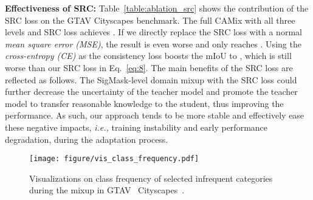 \documentclass[journal]{IEEEtran}
\begin{document}
{\begin{minipage}{\textwidth}
\noindent \textbf{Effectiveness of SRC:} Table~\ref{table:ablation_src} shows the contribution of the SRC loss on the GTAV  Cityscapes benchmark. The full CAMix with all three levels and SRC loss achieves . If we directly replace the SRC loss with a normal \textit{mean square error (MSE)}, the result is even worse and only reaches . Using the \textit{cross-entropy (CE)} as the consistency loss boosts the mIoU to , which is still  worse than our SRC loss in Eq.~\eqref{eq:8}. The main benefits of the SRC loss are reflected as follows. The SigMask-level domain mixup with the SRC loss could further decrease the uncertainty of the teacher model and promote the teacher model to transfer reasonable knowledge to the student, thus improving the performance. As such, our approach tends to be more stable and effectively ease these negative impacts, \emph{i.e.,} training instability and early performance degradation, during the adaptation process.

\begin{table}[t]
\caption{
Ablation study of different meta class lists. }

\label{table:ablation_meta_class}
\begin{center}
\end{center}
\vspace{-4mm}
\end{table}

\begin{figure}[t]
\centering
\texttt{[image: figure/vis\_class\_frequency.pdf]}
\vspace{-2mm}
\caption{
Visualizations on class frequency of selected infrequent categories during the mixup in GTAV~\cite{stephan2016gtav}  Cityscapes~\cite{cordts2016cityscapes}. 
}

\label{fig:visulization_frequency}
\end{figure}


\end{minipage}}
\end{document}
